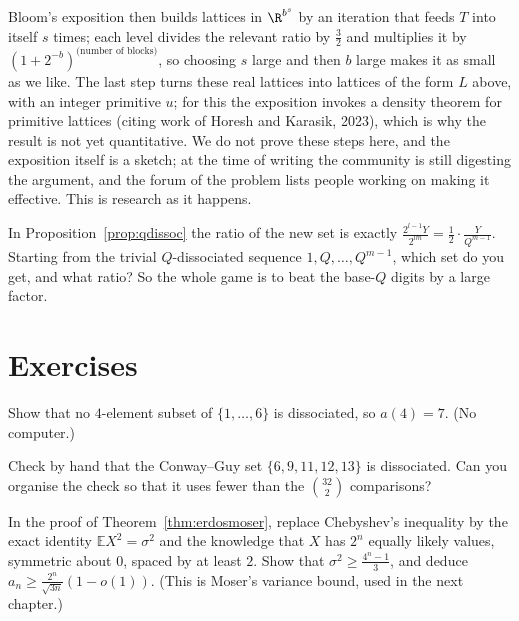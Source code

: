 \begin{remark}
Bloom's exposition then builds lattices in $\R^{b^s}$ by an iteration that feeds $T$ into itself $s$ times; each level divides the relevant
ratio by $\frac32$ and multiplies it by $(1+2^{-b})^{\text{(number of blocks)}}$, so choosing $s$ large and then $b$ large makes it as small as we like.
The last step turns these real lattices into lattices of the form $L$ above, with an integer primitive $u$; for this the exposition invokes a
density theorem for primitive lattices (citing work of Horesh and Karasik, 2023), which is why the result is not yet quantitative. We do not
prove these steps here, and the exposition itself is a sketch; at the time of writing the community is still digesting the argument, and
the forum of the problem lists people working on making it effective. This is research as it happens.
\end{remark}

\begin{think}
In Proposition~\ref{prop:qdissoc} the ratio of the new set is exactly $\frac{2^{l-1}Y}{2^{lm}}=\frac12\cdot\frac Y{Q^{m-1}}$. Starting from the trivial $Q$-dissociated
sequence $1,Q,\dots,Q^{m-1}$, which set do you get, and what ratio? So the whole game is to beat the base-$Q$ digits by a large factor.
\end{think}

\section{Exercises}

\begin{exercise}[$\star$]\label{ex:afour}
Show that no $4$-element subset of $\{1,\dots,6\}$ is dissociated, so $a(4)=7$. (No computer.)
\end{exercise}

\begin{exercise}[$\star$]\label{ex:conwayfive}
Check by hand that the Conway--Guy set $\{6,9,11,12,13\}$ is dissociated. Can you organise the check so that it uses fewer than the $\binom{32}2$ comparisons?
\end{exercise}

\begin{exercise}[$\star\star$]\label{ex:chebopt}
In the proof of Theorem~\ref{thm:erdosmoser}, replace Chebyshev's inequality by the exact identity $\mathbb EX^2=\sigma^2$ and the knowledge that $X$ has $2^n$ equally likely
values, symmetric about $0$, spaced by at least $2$. Show that $\sigma^2\ge\frac{4^n-1}3$, and deduce $a_n\ge\frac{2^n}{\sqrt{3n}}(1-o(1))$. (This is Moser's variance
bound, used in the next chapter.)
\end{exercise}

